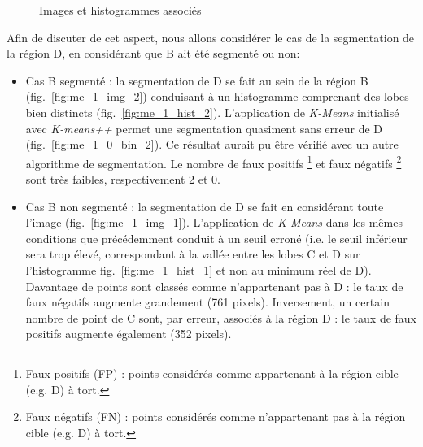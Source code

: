 \begin{figure}[!ht]
		  \caption{Images et histogrammes associés}
	\end{figure}


	Afin de discuter de cet aspect, nous allons considérer le cas de la segmentation de la région D, en considérant que B ait été segmenté ou non:
\begin{itemize}
\item
Cas B segmenté : la segmentation de D se fait au sein de la région B (fig.~\ref{fig:me_1_img_2}) conduisant à un histogramme comprenant des lobes bien distincts (fig.~\ref{fig:me_1_hist_2}). L'application de \emph{K-Means} initialisé avec \emph{K-means++} permet une segmentation quasiment sans erreur de D (fig.~\ref{fig:me_1_0_bin_2}). Ce résultat aurait pu être vérifié avec un autre algorithme de segmentation. Le nombre de faux positifs \footnote{Faux positifs (FP) : points considérés comme appartenant à la région cible (e.g. D) à tort.} et faux négatifs \footnote{Faux négatifs (FN) : points considérés comme n'appartenant pas à la région cible (e.g. D) à tort.} sont très faibles, respectivement 2 et 0.
\item
Cas B non segmenté : la segmentation de D se fait en considérant toute l'image (fig.~\ref{fig:me_1_img_1}). L'application de \emph{K-Means} dans les mêmes conditions que précédemment conduit à un seuil erroné (i.e. le seuil inférieur sera trop élevé, correspondant à la vallée entre les lobes C et D sur l'histogramme fig.~\ref{fig:me_1_hist_1} et non au minimum réel de D). Davantage de points sont classés comme n'appartenant pas à D : le taux de faux négatifs augmente grandement (761 pixels). Inversement, un certain nombre de point de C sont, par erreur, associés à la région D : le taux de faux positifs augmente également (352 pixels).
\end{itemize}\vspace{1em}

